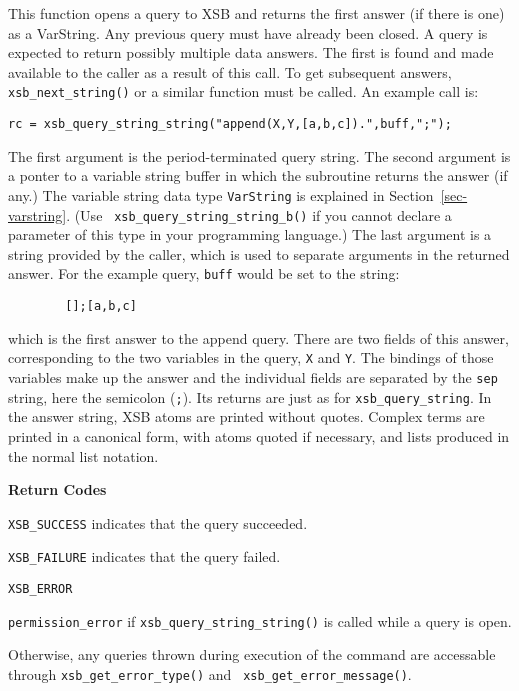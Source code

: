 \begin{description}
  
%
This function opens a query to XSB and returns the first answer (if
there is one) as a VarString.  Any previous query must have already
been closed.  A query is expected to return possibly multiple data
answers.  The first is found and made available to the caller as a
result of this call.  To get subsequent answers, {\tt
  xsb\_next\_string()} or a similar function must be called.  An
example call is:
\begin{verbatim}
rc = xsb_query_string_string("append(X,Y,[a,b,c]).",buff,";");
\end{verbatim}
The first argument is the period-terminated query string.  The second
argument is a ponter to a variable string buffer in which the
subroutine returns the answer (if any.) The variable string data type
{\tt VarString} is explained in Section~\ref{sec-varstring}. (Use {\tt
  xsb\_query\_string\_string\_b()} if you cannot declare a parameter
of this type in your programming language.)  The last argument is a
string provided by the caller, which is used to separate arguments in
the returned answer.  For the example query, {\tt buff} would be set
to the string:
\begin{verbatim}
        [];[a,b,c]
\end{verbatim}
which is the first answer to the append query.  There are two fields
of this answer, corresponding to the two variables in the query,
\verb|X| and \verb|Y|.  The bindings of those variables make up the
answer and the individual fields are separated by the \verb|sep|
string, here the semicolon (\verb|;|).  Its returns are just as for
{\tt xsb\_query\_string}.  In the answer string, XSB atoms are printed
without quotes.  Complex terms are printed in a canonical form, with
atoms quoted if necessary, and lists produced in the normal list
notation.

{\bf Return Codes}  
\bi
\item {\tt XSB\_SUCCESS} indicates that the query succeeded.
%
\item {\tt XSB\_FAILURE} indicates that the query failed.
%
\item {\tt XSB\_ERROR} 
\bi
\item {\tt permission\_error} if {\tt xsb\_query\_string\_string()} is
  called while a query is open.
%
\item Otherwise, any queries thrown during execution of the command
  are accessable through {\tt xsb\_get\_error\_type()} and {\tt
    xsb\_get\_error\_message()}.
\ei
\ei


\end{description}
